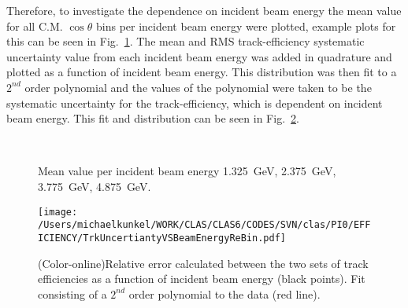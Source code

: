 \documentclass[10pt,a4paper]{report}
\newlength{\figwidth}
\newlength{\hfigheight}
\begin{document}
\FloatBarrier
Therefore, to investigate the dependence on incident beam energy the mean value for all C.M. $\cos \theta$ bins per incident beam energy were plotted, example plots for this can be seen in Fig.~\ref{fig:CGLN1}. The mean and RMS track-efficiency systematic uncertainty value from each incident beam energy was added in quadrature and plotted as a function of incident beam energy. This distribution was then fit to a $2^{nd}$ order polynomial and the values of the polynomial were taken to be the systematic uncertainty for the track-efficiency, which is dependent on incident beam energy. This fit and distribution can be seen in Fig.~\ref{fig:toteff_error}.

\begin{figure}[!ht]
	\centering
%

	 \quad
	 \\
	 \quad
	\caption[Mean value per incident beam energy ]{Mean value per incident beam energy 1.325~GeV, 2.375~GeV, 3.775~GeV, 4.875~GeV.}
	\label{fig:CGLN1}
\end{figure}





\begin{figure}[h!]\begin{center}
		\texttt{[image: /Users/michaelkunkel/WORK/CLAS/CLAS6/CODES/SVN/clas/PI0/EFFICIENCY/TrkUncertiantyVSBeamEnergyReBin.pdf]}
		\caption{(Color-online)Relative error calculated between the two sets of track efficiencies as a function of incident beam energy (black points). Fit consisting of a $2^{nd}$ order polynomial to the data (red line). }\label{fig:toteff_error}
\end{center}\end{figure}
\end{document}
